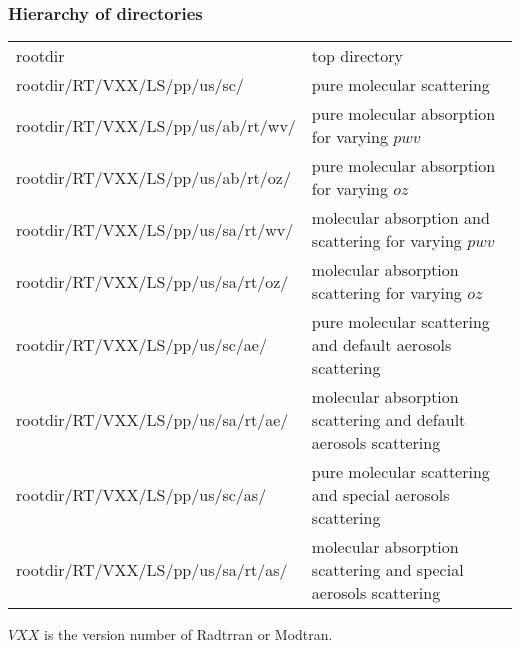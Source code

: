 \documentclass{beamer}
\begin{document}
\begin{frame}
\frametitle{Hierarchy of directories}
\begin{table}
{\tiny
\begin{tabular}{ l l}
  rootdir &  top directory \\
 rootdir/RT/VXX/LS/pp/us/sc/ & pure molecular scattering \\
 rootdir/RT/VXX/LS/pp/us/ab/rt/wv/ & pure molecular absorption for varying $pwv$ \\
 rootdir/RT/VXX/LS/pp/us/ab/rt/oz/ & pure molecular absorption for varying $oz$ \\
 rootdir/RT/VXX/LS/pp/us/sa/rt/wv/ & molecular absorption and scattering for varying $pwv$ \\
 rootdir/RT/VXX/LS/pp/us/sa/rt/oz/ & molecular absorption scattering for varying $oz$ \\
 rootdir/RT/VXX/LS/pp/us/sc/ae/ & pure molecular scattering and default aerosols scattering \\
 rootdir/RT/VXX/LS/pp/us/sa/rt/ae/ & molecular absorption scattering and default aerosols scattering \\
 rootdir/RT/VXX/LS/pp/us/sc/as/ & pure molecular scattering and special aerosols scattering \\
 rootdir/RT/VXX/LS/pp/us/sa/rt/as/ & molecular absorption scattering and special aerosols scattering \\
\end{tabular}
}
\end{table}
$VXX$ is the version number of Radtrran or Modtran.
\end{frame}


\end{document}
